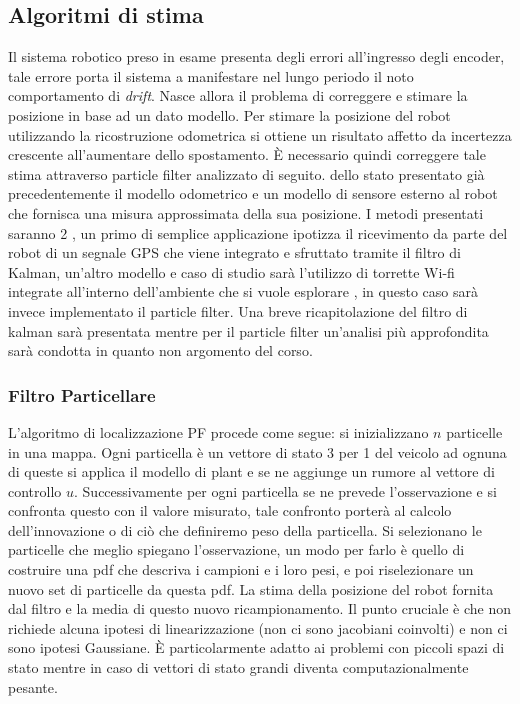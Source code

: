 \subsection{Algoritmi di stima}
Il sistema robotico preso in esame presenta degli errori all'ingresso degli 
encoder, tale errore porta il sistema a manifestare nel lungo periodo il noto 
comportamento di \emph{drift}. Nasce allora il problema di correggere e stimare
la posizione in base ad un dato modello.
Per stimare la posizione del robot utilizzando la ricostruzione 
odometrica si ottiene un risultato affetto da incertezza crescente all'aumentare 
dello spostamento.
È necessario quindi correggere tale stima attraverso particle filter analizzato di seguito.
 dello stato presentato già 
precedentemente il modello odometrico e un modello di sensore esterno al 
robot che fornisca una misura approssimata della sua posizione. 
I metodi presentati saranno 2 , un primo di semplice applicazione ipotizza il 
ricevimento da parte del robot di un segnale GPS che viene integrato e 
sfruttato tramite il filtro di Kalman, un'altro modello e caso di studio sarà 
l'utilizzo di torrette Wi-fi integrate all'interno dell'ambiente che si vuole 
esplorare , in questo caso sarà invece implementato il particle filter. 
Una breve ricapitolazione del filtro di kalman sarà presentata mentre per il 
particle filter un'analisi più approfondita sarà condotta in quanto non 
argomento del corso.
%
\subsubsection{Filtro Particellare}
%
L'algoritmo di localizzazione PF procede come segue: si inizializzano $n$ 
particelle in una mappa.
Ogni particella è un vettore di stato 3 per 1 del veicolo ad ognuna di queste 
si applica il modello di plant e se ne aggiunge un rumore al vettore di controllo $u$. 
Successivamente per ogni particella se ne prevede l'osservazione e si confronta 
questo con il valore misurato, tale confronto porterà al calcolo 
dell'innovazione o di ciò che definiremo peso della particella.
Si selezionano le particelle che meglio spiegano l'osservazione, un modo per 
farlo è quello di costruire una pdf che descriva i campioni e i loro pesi, e 
poi riselezionare un nuovo set di particelle da questa pdf.
La stima della posizione del robot fornita dal filtro e la media di questo 
nuovo ricampionamento. %
%
Il punto cruciale è che non richiede alcuna ipotesi di linearizzazione (non ci 
sono jacobiani coinvolti) e non ci sono ipotesi Gaussiane. È particolarmente 
adatto ai problemi con piccoli spazi di stato mentre in caso di vettori di 
stato grandi diventa computazionalmente pesante.
